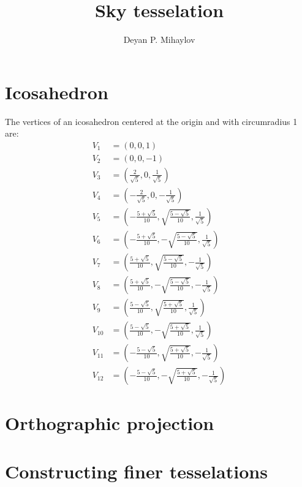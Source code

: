 \documentclass[author-year, prd, amsmath, amssymb, longbibliography, floatfix, reprint, superscriptaddress, a4]{revtex4-1}
\begin{document}

\title[Sky tesselation]{Sky tesselation}

\author{Deyan P. Mihaylov}

\maketitle

\section{Icosahedron}
The vertices of an icosahedron centered at the origin and with circumradius 1 are:
\begin{subequations}
    \begin{align}
    V_{1} &= (0, 0, 1) \\
    V_{2} &= (0, 0, -1) \\
    V_{3} &= \left(\frac{2}{\sqrt{5}}, 0, \frac{1}{\sqrt{5}}\right) \\
    V_{4} &= \left(-\frac{2}{\sqrt{5}}, 0, -\frac{1}{\sqrt{5}}\right) \\
    V_{5} &= \left(-\frac{5+\sqrt{5}}{10}, \sqrt{\frac{5-\sqrt{5}}{10}}, \frac{1}{\sqrt{5}}\right) \\
    V_{6} &= \left(-\frac{5+\sqrt{5}}{10}, -\sqrt{\frac{5-\sqrt{5}}{10}}, \frac{1}{\sqrt{5}}\right) \\
    V_{7} &= \left(\frac{5+\sqrt{5}}{10}, \sqrt{\frac{5-\sqrt{5}}{10}}, -\frac{1}{\sqrt{5}}\right) \\
    V_{8} &= \left(\frac{5+\sqrt{5}}{10}, -\sqrt{\frac{5-\sqrt{5}}{10}}, -\frac{1}{\sqrt{5}}\right) \\
    V_{9} &= \left(\frac{5-\sqrt{5}}{10}, \sqrt{\frac{5+\sqrt{5}}{10}}, \frac{1}{\sqrt{5}}\right) \\
    V_{10} &= \left(\frac{5-\sqrt{5}}{10}, -\sqrt{\frac{5+\sqrt{5}}{10}}, \frac{1}{\sqrt{5}}\right) \\
    V_{11} &= \left(-\frac{5-\sqrt{5}}{10}, \sqrt{\frac{5+\sqrt{5}}{10}}, -\frac{1}{\sqrt{5}}\right) \\
    V_{12} &= \left(-\frac{5-\sqrt{5}}{10}, -\sqrt{\frac{5+\sqrt{5}}{10}}, -\frac{1}{\sqrt{5}}\right)
    \end{align}
\end{subequations}

\section{Orthographic projection}

\section{Constructing finer tesselations}
\end{document}
